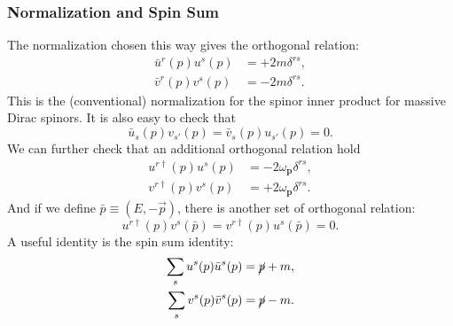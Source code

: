\subsubsection{Normalization and Spin Sum}
The normalization chosen this way gives the orthogonal relation:
\begin{equation}\label{eq:qft-dirac-otho-1}
\begin{aligned}
	\bar{u}^{r}(p) u^{s}(p) &= +2 m \delta^{r s}, \\
	\bar{v}^{r}(p) v^{s}(p) &= -2 m \delta^{r s}.
\end{aligned}
\end{equation} 
This is the (conventional) normalization for the spinor inner product for massive Dirac spinors. 
It is also easy to check that
\begin{equation}
	\bar u_s(p) v_{s'}(p) = \bar v_s(p) u_{s'}(p) = 0.
\end{equation}
We can further check that an additional orthogonal relation hold
\begin{equation}
\begin{aligned}
	u^{r \dagger}(p) u^{s}(p) &= -2 \omega_{\bm p} \delta^{r s}, \\
	v^{r \dagger}(p) v^{s}(p) &= +2 \omega_{\bm p} \delta^{r s}.
\end{aligned}
\end{equation}
And if we define $\bar p \equiv (E,-\vec p)$, there is another set of orthogonal relation:
\begin{equation}
	u^{r\dagger}(p) v^{s}(\bar p) = 
	v^{r\dagger}(p) u^{s}(\bar p) =0.
\end{equation}
A useful identity is the spin sum identity:
\begin{equation}
\begin{aligned}
	\sum_{s} u^{s}(p) \bar{u}^{s}(p) &= \cancel p+m, \\
	\sum_{s} v^{s}(p) \bar{v}^{s}(p) &= \cancel p-m.
\end{aligned}
\end{equation}



